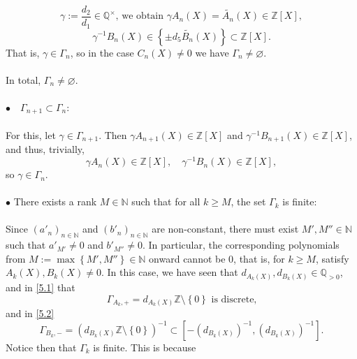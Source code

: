 \begin{solution}
    \[
        \gamma := \frac{d_2}{d_1} \in \mathbb{Q}^{\times}\text{, we obtain } \gamma A_n\left( X \right) = \widetilde{A_n}\left( X \right) \in \mathbb{Z}\left[ X \right],
    \]
    \[
        \gamma^{-1} B_n\left( X \right) \in \left\{ \pm d_5 \widetilde{B_n}\left( X \right) \right\} \subset \mathbb{Z}\left[ X \right].
    \]
    That is, \( \gamma \in \Gamma_n \), so in the case \( C_n\left( X \right) \neq 0 \) we have \( \Gamma_n \neq \varnothing \).
    \\\\
    In total, \( \Gamma_n \neq \varnothing \).
    \\\\
    \( \bullet\quad \Gamma_{n+1} \subset \Gamma_n \):
    \\\\
    For this, let \( \gamma \in \Gamma_{n+1} \). Then \( \gamma A_{n+1}\left(X\right) \in \mathbb{Z}\left[X\right] \) and \( \gamma^{-1} B_{n+1}\left(X\right) \in \mathbb{Z}\left[X\right] \), and thus, trivially,
    \[
        \gamma A_n\left(X\right) \in \mathbb{Z}\left[X\right], \quad \gamma^{-1} B_n\left(X\right) \in \mathbb{Z}\left[X\right],
    \]
    so \( \gamma \in \Gamma_n \).
    \\\\
    \( \bullet \) There exists a rank \( M \in \mathbb{N} \) such that for all \( k \geq M \), the set \( \Gamma_k \) is finite:
    \\\\
    Since \( \left( a'_n \right)_{n \in \mathbb{N}} \) and \( \left( b'_n \right)_{n \in \mathbb{N}} \) are non-constant, there must exist \( M', M'' \in \mathbb{N} \) such that \( a'_{M'} \neq 0 \) and \( b'_{M''} \neq 0 \). In particular, the corresponding polynomials from \( M := \max\left\{ M', M'' \right\} \in \mathbb{N} \) onward cannot be \( 0 \), that is, for \( k \geq M \), satisfy \( A_k\left(X\right), B_k\left(X\right) \neq 0 \). In this case, we have seen that \( d_{A_k\left(X\right)}, d_{B_k\left(X\right)} \in \mathbb{Q}_{>0} \), and in \eqref{5.1} that
    \[
        \Gamma_{A_k,+} = d_{A_k\left(X\right)} \mathbb{Z} \setminus \left\{ 0 \right\} \text{ is discrete,}
    \]
    and in \eqref{5.2}
    \[
        \Gamma_{B_k,-} = \left( d_{B_k\left(X\right)} \mathbb{Z} \setminus \left\{ 0 \right\} \right)^{-1} \subset \left[ -\left( d_{B_k\left(X\right)} \right)^{-1}, \left( d_{B_k\left(X\right)} \right)^{-1} \right].
    \]
    Notice then that \( \Gamma_k \) is finite. This is because
    \begin{align*}

\end{align*}
\end{solution}

